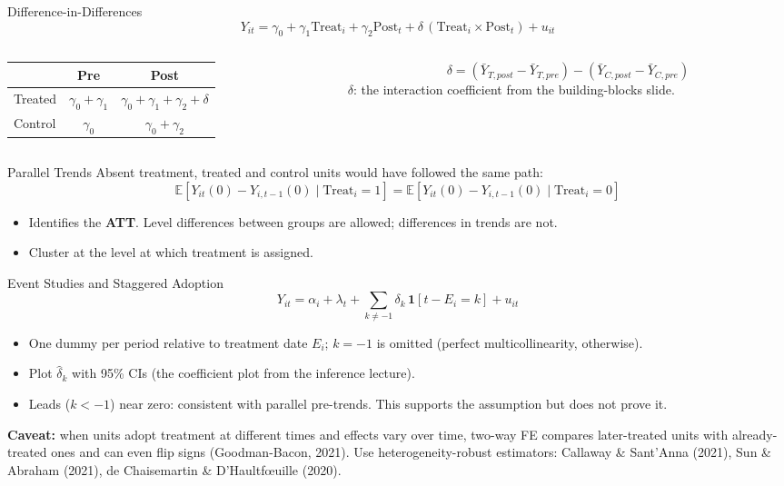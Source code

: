 \documentclass[9pt,aspectratio=169]{beamer}
\newcommand{\E}{\mathbb{E}}
\begin{document}
\begin{frame}{Difference-in-Differences}
\linespread{1.2}\selectfont
  \[
    Y_{it}=\gamma_0+\gamma_1\text{Treat}_i+\gamma_2\text{Post}_t+\delta\,(\text{Treat}_i\times\text{Post}_t)+u_{it}
  \]
  \begin{columns}[T]
    \begin{column}{0.42\textwidth}
      \centering
      \begin{tabular}{lcc}
        \toprule
        & Pre & Post \\
        \midrule
        Treated & $\gamma_0+\gamma_1$ & $\gamma_0+\gamma_1+\gamma_2+\delta$ \\
        Control & $\gamma_0$ & $\gamma_0+\gamma_2$ \\
        \bottomrule
      \end{tabular}
    \end{column}
    \begin{column}{0.56\textwidth}
      \[
        \delta=(\bar Y_{T,post}-\bar Y_{T,pre})-(\bar Y_{C,post}-\bar Y_{C,pre})
      \]
      $\delta$: the interaction coefficient from the building-blocks slide.
    \end{column}
  \end{columns}
  \medskip

  \begin{block}{Parallel Trends}
  Absent treatment, treated and control units would have followed the same path:
  \[
    \E[Y_{it}(0)-Y_{i,t-1}(0)\mid\text{Treat}_i=1]=\E[Y_{it}(0)-Y_{i,t-1}(0)\mid\text{Treat}_i=0]
  \]
  \end{block}
  \begin{itemize}
    \item Identifies the \textbf{ATT}. Level differences between groups are allowed; differences in trends are not.
    \item Cluster at the level at which treatment is assigned.
  \end{itemize}
\end{frame}

\begin{frame}{Event Studies and Staggered Adoption}
\linespread{1.2}\selectfont
  \[
    Y_{it}=\alpha_i+\lambda_t+\sum_{k\neq-1}\delta_k\,\mathbf 1[t-E_i=k]+u_{it}
  \]
  \begin{itemize}
    \item One dummy per period relative to treatment date $E_i$; $k=-1$ is omitted (perfect multicollinearity, otherwise).
    \item Plot $\hat\delta_k$ with 95\% CIs (the coefficient plot from the inference lecture).
    \item Leads ($k<-1$) near zero: consistent with parallel pre-trends. This supports the assumption but does not prove it.
  \end{itemize}
  \medskip
  \textbf{Caveat:} when units adopt treatment at different times and effects vary over time, two-way FE compares later-treated units with already-treated ones and can even flip signs (Goodman-Bacon, 2021). Use heterogeneity-robust estimators: Callaway \& Sant'Anna (2021), Sun \& Abraham (2021), de Chaisemartin \& D'Haultf{\oe}uille (2020).
\end{frame}
\end{document}
